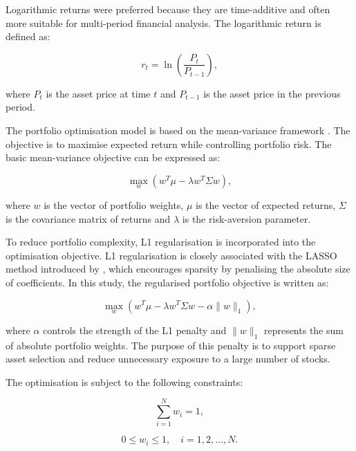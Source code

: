 Logarithmic returns were preferred because they are time-additive and often more suitable for multi-period financial analysis. The logarithmic return is defined as:

\begin{equation}
r_t = \ln\left(\frac{P_t}{P_{t-1}}\right),
\end{equation}

\noindent where $P_t$ is the asset price at time $t$ and $P_{t-1}$ is the asset price in the previous period.

The portfolio optimisation model is based on the mean-variance framework \citep{markowitz1952portfolio}. The objective is to maximise expected return while controlling portfolio risk. The basic mean-variance objective can be expressed as:

\begin{equation}
\max_{w} \left(w^{T}\mu - \lambda w^{T}\Sigma w \right),
\end{equation}

\noindent where $w$ is the vector of portfolio weights, $\mu$ is the vector of expected returns, $\Sigma$ is the covariance matrix of returns and $\lambda$ is the risk-aversion parameter.

To reduce portfolio complexity, L1 regularisation is incorporated into the optimisation objective. L1 regularisation is closely associated with the LASSO method introduced by \citet{tibshirani1996regression}, which encourages sparsity by penalising the absolute size of coefficients. In this study, the regularised portfolio objective is written as:

\begin{equation}
\max_{w} \left(w^{T}\mu - \lambda w^{T}\Sigma w - \alpha \|w\|_1 \right),
\end{equation}

\noindent where $\alpha$ controls the strength of the L1 penalty and $\|w\|_1$ represents the sum of absolute portfolio weights. The purpose of this penalty is to support sparse asset selection and reduce unnecessary exposure to a large number of stocks.

The optimisation is subject to the following constraints:

\begin{equation}
\sum_{i=1}^{N} w_i = 1,
\end{equation}

\begin{equation}
0 \leq w_i \leq 1, \quad i = 1,2,\ldots,N.
\end{equation}

